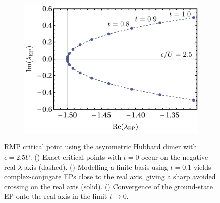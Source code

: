 \documentclass[aps,prb,reprint,noshowkeys,superscriptaddress]{revtex4-1}
\begin{document}
\begin{figure}[t]
\begin{subfigure}{0.32\textwidth}
    \includegraphics[height=0.75\textwidth]{fig7c}
		\subcaption{\label{subfig:rmp_ep_to_cp}}
    \end{subfigure}
	\caption{%
		RMP critical point using the asymmetric Hubbard dimer with $\epsilon = 2.5 U$.
		() Exact critical points with $t=0$ occur on the negative real $\lambda$ axis (dashed).
		() Modelling a finite basis using $t=0.1$ yields complex-conjugate EPs close to the
		real axis, giving a sharp avoided crossing on the real axis (solid).
		() Convergence of the ground-state EP onto the real axis in the limit $t \to 0$.
	\label{fig:RMP_cp}}
\end{figure}
\end{document}
